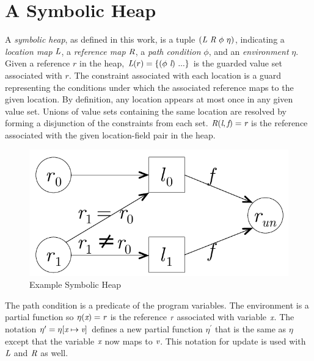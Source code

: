 \section{A Symbolic Heap}
\label{sec:symheap}
A \emph{symbolic heap}, as defined in this work, is a tuple
$(\emph{L}\ \emph{R}\ \phi\ \eta)$, indicating a \emph{location map}
$\emph{L}$, a \emph{reference map} $\emph{R}$, a \emph{path condition} $\phi$, and an \emph{environment} $\eta$.  Given a reference $r$ in the heap,
$\cfgnt{L}(r) = \{(\phi\ \cfgnt{l})\ ...\}$ is the guarded value set
associated with $r$. The constraint associated with each
location is a guard representing the conditions under which the
associated reference maps to the given location. By definition, any
location appears at most once in any given value set. Unions of value
sets containing the same location are resolved by forming a
disjunction of the constraints from each set. $\emph{R}(\emph{l},
\emph{f}) = \emph{r}$ is the reference associated with the given
location-field pair in the heap.

\begin{figure}[t]
\begin{center}
\includegraphics[scale=0.5]{../figs/simple_heap_scratch.pdf}
\end{center}
\caption{Example Symbolic Heap}
\label{fig:exampleHeap}
\end{figure}

The path condition is a predicate of the program variables. The environment is a partial function so $\eta(\emph{x}) = \emph{r}$ is the reference
$\emph{r}$ associated with variable $\emph{x}$. The notation
$\eta^\prime = \eta[\emph{x} \mapsto \emph{v}]$ defines a new
partial function $\eta^\prime$ that is the same as $\eta$ except that
the variable $\emph{x}$ now maps to $\emph{v}$. This notation for update is used with $\emph{L}$ and $\emph{R}$ as well. 

